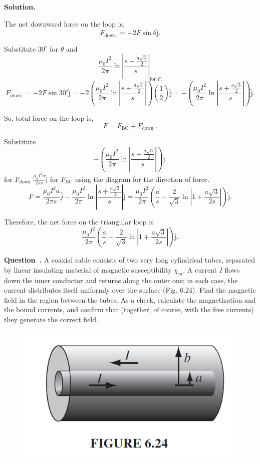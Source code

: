 \documentclass[12pt, a4paper, oneside]{report}
\newcounter{question}
\newenvironment{question}[1][]{\refstepcounter{question}\par\medskip
   \begin{mdframed}[backgroundcolor=gray!20]
   \noindent \textbf{Question~\thequestion. #1} \rmfamily}{\end{mdframed}\medskip}
\newenvironment{solution}{
  \par\medskip\noindent
  \textbf{Solution.}\quad\itshape
  \par\noindent\makebox[\linewidth]{\rule{\textwidth}{0.4pt}}
}{
  \par\noindent\makebox[\linewidth]{\rule{\textwidth}{0.4pt}}
  \par\medskip
}
\begin{document}
\begin{solution}
The net downward force on the loop is,
$$
F_{\text {down }}=-2 F \sin \theta \hat{\mathrm{j}}.
$$

Substitute $30^{\circ}$ for $\theta$ and
$$
\frac{\mu_0 I^2}{2 \pi} \ln \left|\frac{s+\frac{a \sqrt{3}}{2}}{s}\right|_{\text {for } F .}
$$
$$
F_{\text {down }}  =-2 F \sin 30^{\circ} \hat{\mathrm{j}} =-2\left(\frac{\mu_0 I^2}{2 \pi} \ln \left|\frac{s+\frac{a \sqrt{3}}{2}}{s}\right|\right)\left(\frac{1}{2}\right) \hat{\mathrm{j}} =-\left(\frac{\mu_0 I^2}{2 \pi} \ln \left|\frac{s+\frac{a \sqrt{3}}{2}}{s}\right|\right) \hat{\mathrm{j}}.
$$



So, total force on the loop is,
$$
F=F_{\mathrm{BC}}+F_{\text {down }}.
$$

Substitute
$$
-\left(\frac{\mu_0 I^2}{2 \pi} \ln \left|\frac{s+\frac{a \sqrt{3}}{2}}{s}\right|\right) \hat{\mathrm{j}}.
$$
for $F_{\text {down }} \frac{\mu_0 I^2 a}{2 \pi s} \hat{\mathrm{j}}$ for $F_{\mathrm{BC}}$ using the diagram for the direction of force.
$$
F  =\frac{\mu_0 I^2 a}{2 \pi s} \hat{j}-\frac{\mu_0 I^2}{2 \pi} \ln \left|\frac{s+\frac{a \sqrt{3}}{2}}{s}\right| \hat{\mathrm{j}}  =\frac{\mu_0 I^2}{2 \pi}\left(\frac{a}{s}-\frac{2}{\sqrt{3}} \ln \left|1+\frac{a \sqrt{3}}{2 s}\right|\right) \hat{\mathrm{j}}.
$$

Therefore, the net force on the triangular loop is
$$
\frac{\mu_0 I^2}{2 \pi}\left(\frac{a}{s}-\frac{2}{\sqrt{3}} \ln \left|1+\frac{a \sqrt{3}}{2 s}\right|\right) \hat{\mathrm{j}}.
$$
\end{solution}




\begin{question}
A coaxial cable consists of two very long cylindrical tubes, separated by linear insulating material of magnetic susceptibility $\chi_m$. A current $I$ flows down the inner conductor and returns along the outer one; in each case, the current distributes itself uniformly over the surface (Fig. 6.24). Find the magnetic field in the region between the tubes. As a check, calculate the magnetization and the bound currents, and confirm that (together, of course, with the free currents) they generate the correct field.
\end{question}

\begin{figure}[ht!]
    \centering
    \includegraphics[width=0.5\linewidth]{13.png}
    \caption{}
    \label{fig:enter-label}
\end{figure}
\end{document}

